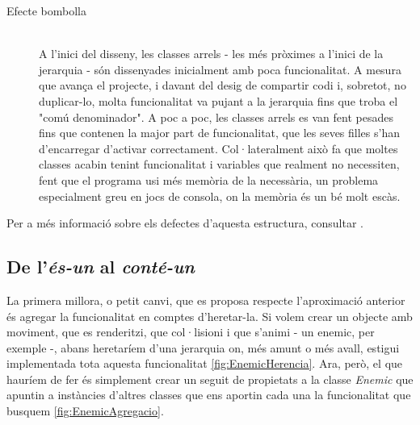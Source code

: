 \begin{description}
\begin{description}
    \end{description}
  \item[Efecte bombolla] \hfill \\
    A l'inici del disseny, les classes arrels - les més pròximes a l'inici de la jerarquia - són dissenyades inicialment amb poca funcionalitat. A mesura que avança el projecte, i davant del desig de compartir codi i, sobretot, no duplicar-lo, molta funcionalitat va pujant a la jerarquia fins que troba el "comú denominador". A poc a poc, les classes arrels es van fent pesades fins que contenen la major part de funcionalitat, que les seves filles s'han d'encarregar d'activar correctament. Col·lateralment això fa que moltes classes acabin tenint funcionalitat i variables que realment no necessiten, fent que el programa usi més memòria de la necessària, un problema especialment greu en jocs de consola, on la memòria és un bé molt escàs.
    
\end{description}

Per a més informació sobre els defectes d'aquesta estructura, consultar \cite{Wilson02}.

\subsection{De l'{\em és-un} al {\em conté-un}}


La primera millora, o petit canvi, que es proposa respecte l'aproximació anterior és agregar la funcionalitat en comptes d'heretar-la. Si volem crear un objecte amb moviment, que es renderitzi, que col·lisioni i que s'animi - un enemic, per exemple -, abans heretaríem d'una jerarquia on, més amunt o més avall, estigui implementada tota aquesta funcionalitat \ref{fig:EnemicHerencia}. Ara, però, el que hauríem de fer és simplement crear un seguit de propietats a la classe {\em Enemic} que apuntin a instàncies d'altres classes que ens aportin cada una la funcionalitat que busquem \ref{fig:EnemicAgregacio}.

